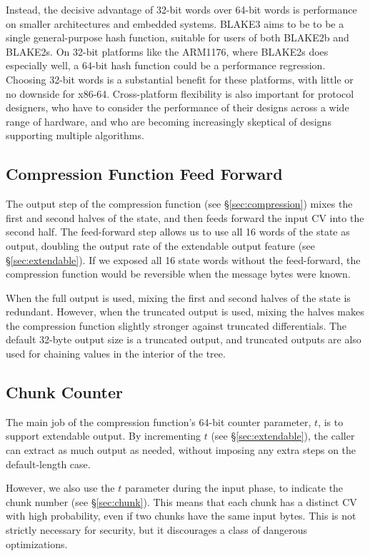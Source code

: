 \documentclass[11pt,notitlepage,a4paper]{article}
\begin{document}
Instead, the decisive advantage of 32-bit words over 64-bit words is
performance on smaller architectures and embedded systems. BLAKE3 aims to be to
be a single general-purpose hash function, suitable for users of both BLAKE2b
and BLAKE2s. On 32-bit platforms like the ARM1176, where BLAKE2s does
especially well, a 64-bit hash function could be a performance regression.
Choosing 32-bit words is a substantial benefit for these platforms, with little
or no downside for x86-64. Cross-platform flexibility is also important for
protocol designers, who have to consider the performance of their designs
across a wide range of hardware, and who are becoming increasingly skeptical of
designs supporting multiple algorithms.\cite{WG}

\subsection{Compression Function Feed Forward}\label{sec:feedforward}

The output step of the compression function (see \S\ref{sec:compression}) mixes
the first and second halves of the state, and then feeds forward the input CV
into the second half. The feed-forward step allows us to use all 16 words of
the state as output, doubling the output rate of the extendable output feature
(see \S\ref{sec:extendable}). If we exposed all 16 state words without the
feed-forward, the compression function would be reversible when the message
bytes were known.

When the full output is used, mixing the first and second halves of the state
is redundant. However, when the truncated output is used, mixing the halves
makes the compression function slightly stronger against truncated
differentials. The default 32-byte output size is a truncated output, and
truncated outputs are also used for chaining values in the interior of the
tree.

\subsection{Chunk Counter}\label{sec:chunkcounter}

The main job of the compression function's 64-bit counter parameter, $t$, is to
support extendable output. By incrementing $t$ (see \S\ref{sec:extendable}),
the caller can extract as much output as needed, without imposing any extra
steps on the default-length case.

However, we also use the $t$ parameter during the input phase, to indicate the
chunk number (see \S\ref{sec:chunk}). This means that each chunk has a distinct
CV with high probability, even if two chunks have the same input bytes. This is
not strictly necessary for security, but it discourages a class of dangerous
optimizations.
\end{document}
